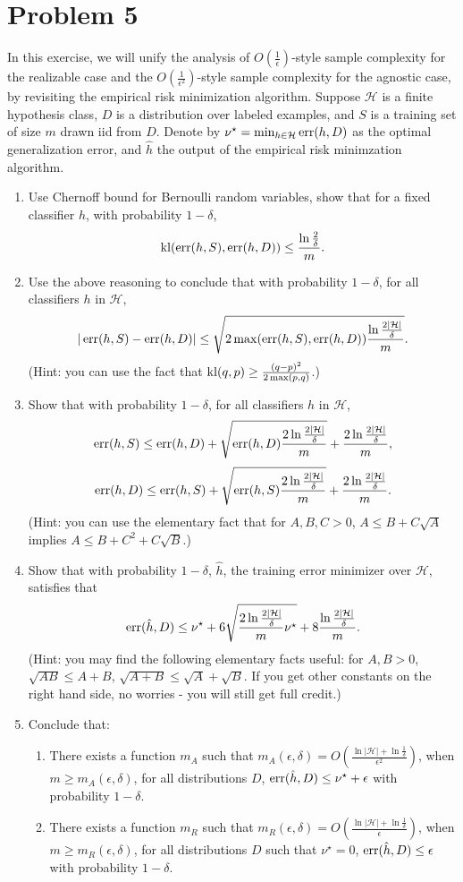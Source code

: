 \documentclass{article}
\DeclareMathOperator*{\kl}{{\rm kl}}
\DeclareMathOperator*{\err}{{\rm err}}
\newcommand{\Hcal}{\mathcal{H}} %
\begin{document}
\section*{Problem 5}
In this exercise, we will unify the analysis of $O(\frac{1}{\epsilon})$-style sample
complexity for the realizable case and the $O(\frac{1}{\epsilon^2})$-style sample complexity
for the agnostic case, by revisiting the empirical risk minimization algorithm. Suppose $\Hcal$ is a finite hypothesis class, $D$ is a distribution over labeled examples, and $S$ is a training set of size $m$ drawn iid from $D$. Denote by  $\nu^\star = \min_{h \in \Hcal} \err(h,D)$ as the optimal generalization error, and $\hat{h}$ the output of the empirical risk minimzation algorithm.

\begin{enumerate}
\item Use Chernoff bound for Bernoulli random variables, show that for a fixed classifier
$h$, with probability $1-\delta$,
\[ \kl(\err(h,S), \err(h,D)) \leq \frac{\ln\frac{2}{\delta}}{m}. \]
\item Use the above reasoning to conclude that with probability $1-\delta$, for all classifiers $h$ in $\Hcal$,
\[ |\err(h,S) - \err(h,D)| \leq \sqrt{2 \max(\err(h,S), \err(h,D)) \frac{\ln\frac{2|\Hcal|}{\delta}}{m}}. \]
(Hint: you can use the fact that $\kl(q,p) \geq \frac{(q-p)^2}{2\max(p,q)}$.)
\item Show that with probability $1-\delta$, for all classifiers $h$ in $\Hcal$,
\[ \err(h,S) \leq \err(h,D) + \sqrt{\err(h,D) \frac{2\ln\frac{2|\Hcal|}{\delta}}{m}} + \frac{2\ln\frac{2|\Hcal|}{\delta}}{m}, \]
\[ \err(h,D) \leq \err(h,S) + \sqrt{\err(h,S) \frac{2\ln\frac{2|\Hcal|}{\delta}}{m}} + \frac{2\ln\frac{2|\Hcal|}{\delta}}{m}. \]
(Hint: you can use the elementary fact that for $A, B, C > 0$, $A \leq B + C \sqrt{A}$ implies $A \leq B + C^2 + C\sqrt{B}$.)
\item Show that with probability $1-\delta$, $\hat{h}$, the training error minimizer over $\Hcal$, satisfies that
\[ \err(\hat{h}, D) \leq \nu^\star + 6\sqrt{\frac{2\ln\frac{2|\Hcal|}{\delta}}{m} \nu^\star} + 8\frac{\ln\frac{2|\Hcal|}{\delta}}{m}. \]
(Hint: you may find the following elementary facts useful: for $A, B > 0$, $\sqrt{AB} \leq A +B$, $\sqrt{A + B} \leq \sqrt{A} + \sqrt{B}$. If you get other constants on the right hand side, no worries - you will still get full credit.)
\item Conclude that:
\begin{enumerate}
  \item There exists a function $m_A$ such that $m_A(\epsilon,\delta) = O(\frac{\ln|\Hcal| + \ln\frac1\delta}{\epsilon^2})$, when $m \geq m_A(\epsilon,\delta)$, for all distributions $D$, $\err(\hat{h}, D) \leq \nu^\star + \epsilon$ with probability $1-\delta$.
  \item There exists a function $m_R$ such that $m_R(\epsilon,\delta) = O(\frac{\ln|\Hcal| + \ln\frac1\delta}{\epsilon})$, when $m \geq m_R(\epsilon,\delta)$, for all distributions $D$ such that $\nu^\star = 0$, $\err(\hat{h}, D) \leq \epsilon$ with probability $1-\delta$.
\end{enumerate}
\end{enumerate}
\end{document}
